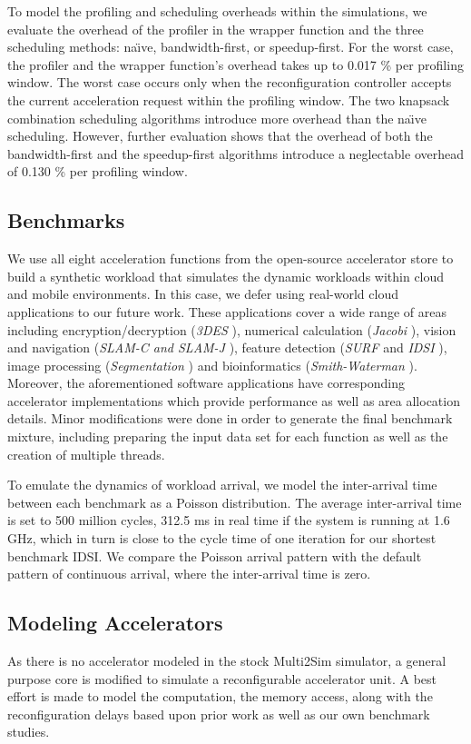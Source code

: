 To model the profiling and scheduling overheads within the simulations,
we evaluate the overhead of the profiler in the wrapper function and the
three scheduling methods: na\"{\i}ve, bandwidth-first, or speedup-first. For
the worst case, the profiler and the wrapper function's overhead takes up
to 0.017 \% per profiling window.  The worst case occurs only
when the reconfiguration controller accepts the current acceleration
request within the profiling window. The two knapsack combination
scheduling algorithms introduce more overhead than the na\"{\i}ve scheduling. However, further evaluation shows that the overhead of both the bandwidth-first and the speedup-first algorithms introduce a neglectable overhead of 0.130 \% per profiling window. 

\subsection{Benchmarks}
We use all eight acceleration functions from the
open-source accelerator store \cite{accstore} to build a synthetic
workload that simulates the dynamic workloads within cloud and mobile
environments.  In this case, we defer using real-world cloud applications to our
future work.  These applications cover a wide range of areas
including encryption/decryption ({\em 3DES} \cite{openssl}), numerical
calculation ({\em Jacobi} \cite{jacobi-wiki}), vision and navigation
({\em SLAM-C and SLAM-J} \cite{openslam}), feature detection ({\em SURF} and
{\em IDSI} \cite{opencv}), image processing ({\em Segmentation}
\cite{segmentation-wiki}) and bioinformatics ({\em Smith-Waterman}
\cite{smithwaterman-wiki}). Moreover, the aforementioned software applications have
corresponding accelerator implementations which provide
performance as well as area allocation details. Minor modifications were done in order to generate the
final benchmark mixture, including preparing the input data set for
each function as well as the creation of multiple threads.

To emulate the dynamics of workload arrival, we model the inter-arrival time between
each benchmark as a Poisson distribution. The average
inter-arrival time is set to 500 million cycles, 312.5 ms
in real time if the system is running at 1.6 GHz, which in turn is close to the
cycle time of one iteration for our shortest benchmark IDSI. We compare
the Poisson arrival pattern with the default pattern of continuous
arrival, where the inter-arrival time is zero.

\subsection{Modeling Accelerators}
As there is no accelerator modeled in the stock Multi2Sim simulator,
 a general purpose core is modified to simulate a reconfigurable
accelerator unit. A best effort is made to model the
computation, the memory access, along with the reconfiguration delays based
upon prior work as well as our own benchmark studies. 

